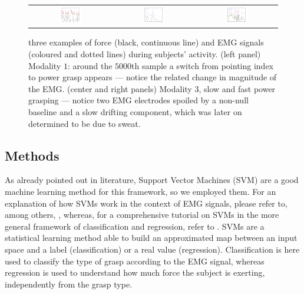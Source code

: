 \begin{figure}[!ht] \centering
  \begin{tabular}{ccc}
    \includegraphics[width=0.3\textwidth]{figs/example_signal1} &
    \includegraphics[width=0.3\textwidth]{figs/example_signal2} &
    \includegraphics[width=0.3\textwidth]{figs/example_signal3} \\
  \end{tabular}
  \caption{three examples of force (black, continuous line) and EMG
    signals (coloured and dotted lines) during subjects'
    activity. (left panel) Modality $1$: around the $5000$th sample a
    switch from pointing index to  power grasp appears --- notice the
    related change in magnitude of the EMG. (center
    and right panels) Modality $3$, slow and fast power grasping ---
    notice two EMG electrodes spoiled by a non-null baseline and a
    slow drifting component, which was later on determined to be due
    to sweat.}
  \label{fig:ex_signals}
\end{figure}

\subsection{Methods}

As already pointed out in literature, Support Vector Machines (SVM)
\cite{BGV92} are a good machine learning method for this framework, so we
employed them. For an explanation of how SVMs work in the context of
EMG signals, please refer to, among others,
\cite{2008.ICRA,2008.BioCyb}, whereas, for a comprehensive tutorial on
SVMs in the more general framework of classification and regression,
refer to \cite{Burges98,SmolaTut2004}. SVMs are a statistical learning
method able to build an approximated map between an input space and a
label (classification) or a real value (regression). Classification is
here used to classify the type of grasp according to the EMG signal,
whereas regression is used to understand how much force the subject is
exerting, independently from the grasp type.

